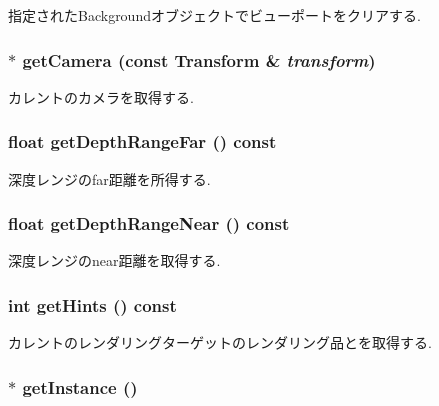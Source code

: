 指定されたBackgroundオブジェクトでビューポートをクリアする. \hypertarget{classm3g_1_1Graphics3D_570b81f426d1b2b5e8794cffb33422c6}{
\subsubsection[{getCamera}]{ $\ast$ getCamera (const {\bf Transform} \& {\em transform})}}
\label{classm3g_1_1Graphics3D_570b81f426d1b2b5e8794cffb33422c6}


カレントのカメラを取得する. \hypertarget{classm3g_1_1Graphics3D_c8c185b99073215202d2e35723f5c470}{
\subsubsection[{getDepthRangeFar}]{\setlength{\rightskip}{0pt plus 5cm}float getDepthRangeFar () const}}
\label{classm3g_1_1Graphics3D_c8c185b99073215202d2e35723f5c470}


深度レンジのfar距離を所得する. \hypertarget{classm3g_1_1Graphics3D_60bc116f673bf2782de2df3eebfb2c92}{
\subsubsection[{getDepthRangeNear}]{\setlength{\rightskip}{0pt plus 5cm}float getDepthRangeNear () const}}
\label{classm3g_1_1Graphics3D_60bc116f673bf2782de2df3eebfb2c92}


深度レンジのnear距離を取得する. \hypertarget{classm3g_1_1Graphics3D_5837234a23dc5f46d3adec17f521b58e}{
\subsubsection[{getHints}]{\setlength{\rightskip}{0pt plus 5cm}int getHints () const}}
\label{classm3g_1_1Graphics3D_5837234a23dc5f46d3adec17f521b58e}


カレントのレンダリングターゲットのレンダリング品とを取得する. \hypertarget{classm3g_1_1Graphics3D_da6d71754bfe755dd8204a9332e9ed47}{
\subsubsection[{getInstance}]{ $\ast$ getInstance ()}}
\label{classm3g_1_1Graphics3D_da6d71754bfe755dd8204a9332e9ed47}


